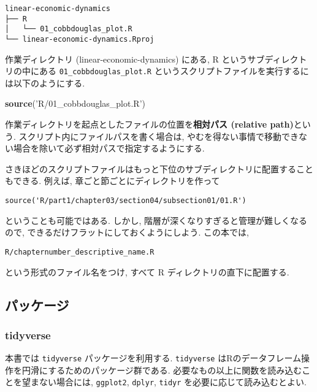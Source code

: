 \documentclass[a4paper]{scrbook}
\newenvironment{Shaded}{\begin{snugshade}}{\end{snugshade}}
\newcommand{\KeywordTok}[1]{\textcolor[rgb]{0.13,0.29,0.53}{\textbf{{#1}}}}
\newcommand{\StringTok}[1]{\textcolor[rgb]{0.31,0.60,0.02}{{#1}}}
\newcommand{\NormalTok}[1]{{#1}}
\theoremstyle{definition}
\begin{document}
\begin{verbatim}
linear-economic-dynamics
├── R
│   └── 01_cobbdouglas_plot.R
└── linear-economic-dynamics.Rproj
\end{verbatim}

作業ディレクトリ (linear-economic-dynamics) にある, R
というサブディレクトリの中にある \texttt{01\_cobbdouglas\_plot.R}
というスクリプトファイルを実行するには以下のようにする.

\begin{Shaded}
\begin{Highlighting}[]
\KeywordTok{source}\NormalTok{(}\StringTok{'R/01_cobbdouglas_plot.R'}\NormalTok{)}
\end{Highlighting}
\end{Shaded}

作業ディレクトリを起点としたファイルの位置を\textbf{相対パス (relative
path)}という. スクリプト内にファイルパスを書く場合は,
やむを得ない事情で移動できない場合を除いて必ず相対パスで指定するようにする.

さきほどのスクリプトファイルはもっと下位のサブディレクトリに配置することもできる.
例えば, 章ごと節ごとにディレクトリを作って

\begin{verbatim}
source('R/part1/chapter03/section04/subsection01/01.R')
\end{verbatim}

ということも可能ではある. しかし,
階層が深くなりすぎると管理が難しくなるので,
できるだけフラットにしておくようにしよう. この本では,

\begin{verbatim}
R/chapternumber_descriptive_name.R
\end{verbatim}

という形式のファイル名をつけ, すべて R ディレクトリの直下に配置する.

\subsection{パッケージ}

\subsubsection*{tidyverse}\label{tidyverse}

本書では \texttt{tidyverse} パッケージを利用する. \texttt{tidyverse}
はRのデータフレーム操作を円滑にするためのパッケージ群である.
必要なもの以上に関数を読み込むことを望まない場合には, \texttt{ggplot2},
\texttt{dplyr}, \texttt{tidyr} を必要に応じて読み込むとよい.
\end{document}
